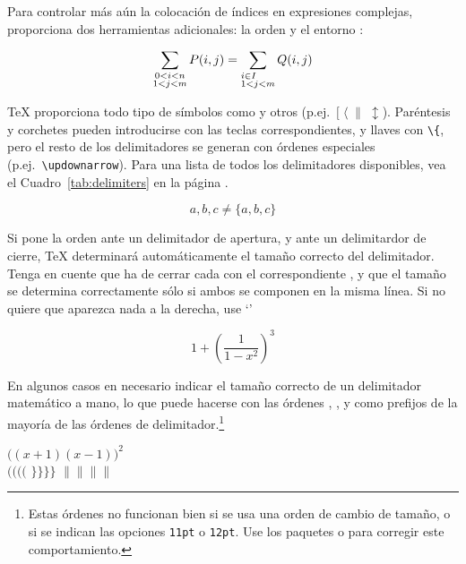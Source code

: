 Para controlar más aún la colocación de índices en expresiones complejas,  proporciona dos herramientas adicionales: la orden  y el entorno :
\begin{example}
\begin{displaymath}
\sum_{\substack{0<i<n \\ 1<j<m}}
   P(i,j) =
\sum_{\begin{subarray}{l}
         i\in I\\
         1<j<m
      \end{subarray}}     Q(i,j)
\end{displaymath}
\end{example}

\medskip

\TeX{} proporciona todo tipo de símbolos como \textbf{} y otros  (p.ej.~$[\;\langle\;\|\;\updownarrow$). Paréntesis y corchetes pueden introducirse con las teclas correspondientes, y llaves con \verb|\{|, pero el resto de los delimitadores se generan con órdenes especiales (p.ej.~\verb|\updownarrow|).  Para una lista de todos los delimitadores disponibles, vea el Cuadro~\ref{tab:delimiters} en la página \pageref{tab:delimiters}.
\begin{example}
\begin{displaymath}
{a,b,c}\neq\{a,b,c\}
\end{displaymath}
\end{example}

Si pone la orden  ante un delimitador de apertura, y  ante un delimitardor de cierre, \TeX{} determinará automáticamente el tamaño correcto del delimitador.  Tenga en cuente que ha de cerrar cada  con el correspondiente , y que el tamaño se determina correctamente sólo si ambos se componen en la misma línea.  Si no quiere que aparezca nada a la derecha, use `'
\begin{example}
\begin{displaymath}
1 + \left( \frac{1}{ 1-x^{2} }
    \right) ^3
\end{displaymath}
\end{example}

En algunos casos en necesario indicar el tamaño correcto de un delimitador matemático a mano, lo que puede hacerse con las órdenes , ,  y  como prefijos de la mayoría de las órdenes de delimitador.\footnote{Estas órdenes no funcionan bien si se usa una orden de cambio de tamaño, o si se indican las opciones \texttt{11pt} o \texttt{12pt}.  Use los paquetes  o  para corregir este comportamiento.}
\begin{example}
$\Big( (x+1) (x-1) \Big) ^{2}$\\
$\big(\Big(\bigg(\Bigg($\quad
$\big\}\Big\}\bigg\}\Bigg\}$
\quad
$\big\|\Big\|\bigg\|\Bigg\|$
\end{example}

